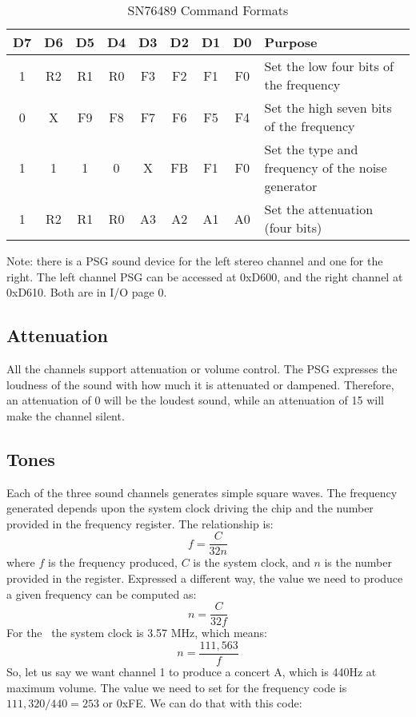 \begin{table}[ht]
	\begin{center}
		\begin{tabular}{|c|c|c|c|c|c|c|c|l|} \hline
			D7 & D6 & D5 & D4 & D3 & D2 & D1 & D0 & Purpose \\ \hline \hline
			1 & R2 & R1 & R0 & F3 & F2 & F1 & F0 & Set the low four bits of the frequency \\ \hline
			0 & X & F9 & F8 & F7 & F6 & F5 & F4 & Set the high seven bits of the frequency \\ \hline
			1 & 1 & 1 & 0 & X & FB & F1 & F0 & Set the type and frequency of the noise generator \\ \hline
			1 & R2 & R1 & R0 & A3 & A2 & A1 & A0 & Set the attenuation (four bits) \\ \hline
		\end{tabular}
		\caption{SN76489 Command Formats}
	\end{center}
	\label{tab:psg_commands}
\end{table}

Note: there is a PSG sound device for the left stereo channel and one for the right. The left channel PSG can be accessed at 0xD600, and the right channel at 0xD610. Both are in I/O page 0.

\subsection*{Attenuation}

All the channels support attenuation or volume control. The PSG expresses the loudness of the sound with how much it is attenuated or dampened. Therefore, an attenuation of 0 will be the loudest sound, while an attenuation of 15 will make the channel silent.

\subsection*{Tones}

Each of the three sound channels generates simple square waves. The frequency generated depends upon the system clock driving the chip and the number provided in the frequency register. The relationship is:
\[
f = \frac{C}{32n}
\]
where $f$ is the frequency produced, $C$ is the system clock, and $n$ is the number provided in the register. Expressed a different way, the value we need to produce a given frequency can be computed as:
\[
n = \frac{C}{32f}
\]
For the \jr\ the system clock is 3.57 MHz, which means:
\[
n = \frac{111,563}{f}
\]
So, let us say we want channel 1 to produce a concert A, which is 440Hz at maximum volume. The value we need to set for the frequency code is $111,320 / 440 = 253$ or 0xFE. We can do that with this code:


